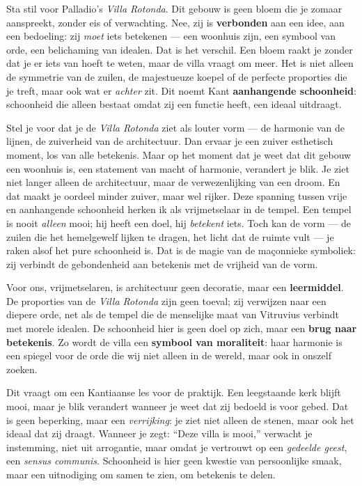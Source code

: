 \documentclass{article}
\begin{document}
Sta stil voor Palladio’s \textit{Villa Rotonda}. Dit gebouw is geen bloem die je zomaar aanspreekt, zonder eis of verwachting. Nee, zij is \textbf{verbonden} aan een idee, aan een bedoeling: zij \textit{moet} iets betekenen --- een woonhuis zijn, een symbool van orde, een belichaming van idealen. Dat is het verschil. Een bloem raakt je zonder dat je er iets van hoeft te weten, maar de villa vraagt om meer. Het is niet alleen de symmetrie van de zuilen, de majestueuze koepel of de perfecte proporties die je treft, maar ook wat er \textit{achter} zit. Dit noemt Kant \textbf{aanhangende schoonheid}: schoonheid die alleen bestaat omdat zij een functie heeft, een ideaal uitdraagt.

Stel je voor dat je de \textit{Villa Rotonda} ziet als louter vorm --- de harmonie van de lijnen, de zuiverheid van de architectuur. Dan ervaar je een zuiver esthetisch moment, los van alle betekenis. Maar op het moment dat je weet dat dit gebouw een woonhuis is, een statement van macht of harmonie, verandert je blik. Je ziet niet langer alleen de architectuur, maar de verwezenlijking van een droom. En dat maakt je oordeel minder zuiver, maar wel rijker. Deze spanning tussen vrije en aanhangende schoonheid herken ik als vrijmetselaar in de tempel. Een tempel is nooit \textit{alleen} mooi; hij heeft een doel, hij \textit{betekent} iets. Toch kan de vorm --- de zuilen die het hemelgewelf lijken te dragen, het licht dat de ruimte vult --- je raken alsof het pure schoonheid is. Dat is de magie van de maçonnieke symboliek: zij verbindt de gebondenheid aan betekenis met de vrijheid van de vorm.

Voor ons, vrijmetselaren, is architectuur geen decoratie, maar een \textbf{leermiddel}. De proporties van de \textit{Villa Rotonda} zijn geen toeval; zij verwijzen naar een diepere orde, net als de tempel die de menselijke maat van Vitruvius verbindt met morele idealen. De schoonheid hier is geen doel op zich, maar een \textbf{brug naar betekenis}. Zo wordt de villa een \textbf{symbool van moraliteit}: haar harmonie is een spiegel voor de orde die wij niet alleen in de wereld, maar ook in onszelf zoeken.

Dit vraagt om een Kantiaanse les voor de praktijk. Een leegstaande kerk blijft mooi, maar je blik verandert wanneer je weet dat zij bedoeld is voor gebed. Dat is geen beperking, maar een \textit{verrijking}: je ziet niet alleen de stenen, maar ook het ideaal dat zij draagt. Wanneer je zegt: ``Deze villa is mooi,'' verwacht je instemming, niet uit arrogantie, maar omdat je vertrouwt op een \textit{gedeelde geest}, een \textit{sensus communis}. Schoonheid is hier geen kwestie van persoonlijke smaak, maar een uitnodiging om samen te zien, om betekenis te delen.
\end{document}
